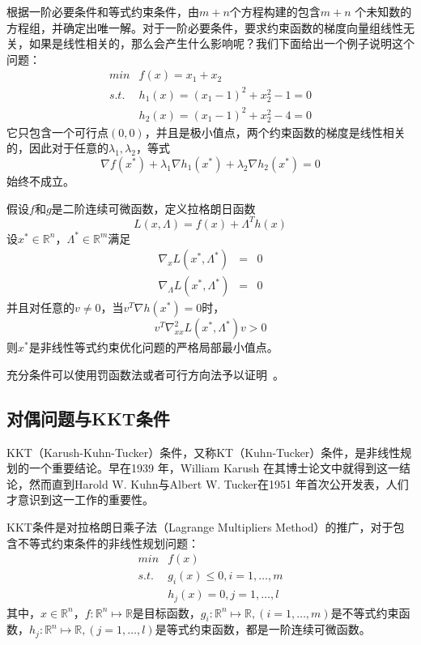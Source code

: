 根据一阶必要条件和等式约束条件，由$m+n$个方程构建的包含$m+n$ 个未知数的方程组，并确定出唯一解。对于一阶必要条件，要求约束函数的梯度向量组线性无关，如果是线性相关的，那么会产生什么影响呢？我们下面给出一个例子说明这个问题：
\begin{equation}
    \begin{array}{lll}
      \textit{min} & f(x) = x_1 +  x_2 \\
      \textit{s.t.} & h_1(x) = (x_1-1)^2 + x_2^2 - 1 = 0 \\
       & h_2(x) = (x_1-1)^2 + x_2^2 - 4 = 0
    \end{array}
\end{equation}
它只包含一个可行点$(0,0)$，并且是极小值点，两个约束函数的梯度是线性相关的，因此对于任意的$\lambda_1,\lambda_2$，等式
\[
    \nabla f(x^*) + \lambda_1 \nabla h_1(x^*) + \lambda_2 \nabla h_2(x^*) = 0
\]
始终不成立。

\begin{theorem}[充分条件]
假设$f$和$g$是二阶连续可微函数，定义拉格朗日函数
\begin{equation}
    L(x,\Lambda) = f(x) + \Lambda^T h(x)
\end{equation}
设$x^*\in \mathbb{R}^n$，$\Lambda^*\in \mathbb{R}^m$满足
\begin{equation}
    \begin{array}{lll}
      \nabla_x L(x^*,\Lambda^*) & = & 0 \\
      \nabla_{\Lambda} L(x^*,\Lambda^*) & = & 0
    \end{array}
\end{equation}
并且对任意的$v\ne 0$，当$v^T \nabla h(x^*) = 0$时，
\begin{equation}
    v^T \nabla_{xx}^2 L(x^*,\Lambda^*) v > 0
\end{equation}
则$x^*$是非线性等式约束优化问题的严格局部最小值点。
\end{theorem}

充分条件可以使用罚函数法或者可行方向法予以证明~\cite{bertsekas1999nonlinear}。
\subsection{对偶问题与KKT条件}
KKT（Karush-Kuhn-Tucker）条件，又称KT（Kuhn-Tucker）条件，是非线性规划的一个重要结论。早在1939 年，William Karush\cite{karush1939minima} 在其博士论文中就得到这一结论，然而直到Harold W. Kuhn与Albert W. Tucker在1951 年首次公开发表\cite{kuhn1951nonlinear}，人们才意识到这一工作的重要性。

KKT条件是对拉格朗日乘子法（Lagrange Multipliers Method）的推广，对于包含不等式约束条件的非线性规划问题：
\begin{equation}\label{eq:nlp}
    \begin{array}{lll}
      \textit{min} & f(x) \\
      \textit{s.t.} & g_i(x) \le 0, i = 1, \ldots, m\\
       & h_j(x) = 0, j = 1,\ldots, l
    \end{array}
\end{equation}
其中，$x\in \mathbb{R}^n$，$f:\mathbb{R}^n \mapsto \mathbb{R}$是目标函数，$g_i:\mathbb{R}^n \mapsto \mathbb{R},(i=1,\ldots,m)$是不等式约束函数，$h_j:\mathbb{R}^n \mapsto \mathbb{R},(j=1,\ldots,l)$是等式约束函数，都是一阶连续可微函数。

